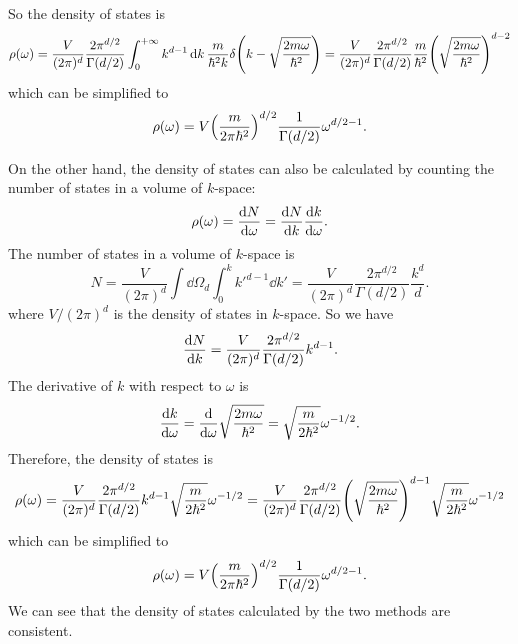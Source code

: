 \documentclass{article}
\begin{document}
So the density of states is
\begin{equation}
    \rho(\omega)=\frac{V}{(2\pi)^d}\frac{2\pi^{d/2}}{\Gamma(d/2)}\int_0^{+\infty} k^{d-1}\dd{k}\frac{m}{\hbar^2 k}\delta\qty(k-\sqrt{\frac{2m\omega}{\hbar^2}})=\frac{V}{(2\pi)^d}\frac{2\pi^{d/2}}{\Gamma(d/2)}\frac{m}{\hbar^2}\qty(\sqrt{\frac{2m\omega}{\hbar^2}})^{d-2}
\end{equation}
which can be simplified to
\begin{equation}
    \rho(\omega)=V\qty(\frac{m}{2\pi \hbar^2})^{d/2}\frac{1}{\Gamma(d/2)}\omega^{d/2-1}.
\end{equation}

On the other hand, the density of states can also be calculated by counting the number of states in a volume of $k$-space:
\begin{equation}
    \rho(\omega)=\dv{N}{\omega}=\dv{N}{k}\dv{k}{\omega}.
\end{equation}
The number of states in a volume of $k$-space is
\begin{equation}
    N=\frac{V}{(2\pi)^d}\int \dd{\Omega_d}\int_0^k k'^{d-1}\dd{k'}=\frac{V}{(2\pi)^d}\frac{2\pi^{d/2}}{\Gamma(d/2)}\frac{k^d}{d}.
\end{equation}
where $V/(2\pi)^d$ is the density of states in $k$-space.
So we have
\begin{equation}
    \dv{N}{k}=\frac{V}{(2\pi)^d}\frac{2\pi^{d/2}}{\Gamma(d/2)}k^{d-1}.
\end{equation}
The derivative of $k$ with respect to $\omega$ is
\begin{equation}
    \dv{k}{\omega}=\dv{}{\omega}\sqrt{\frac{2m\omega}{\hbar^2}}=\sqrt{\frac{m}{2\hbar^2}}\omega^{-1/2}.
\end{equation}
Therefore, the density of states is
\begin{equation}
    \rho(\omega)=\frac{V}{(2\pi)^d}\frac{2\pi^{d/2}}{\Gamma(d/2)}k^{d-1}\sqrt{\frac{m}{2\hbar^2}}\omega^{-1/2}=\frac{V}{(2\pi)^d}\frac{2\pi^{d/2}}{\Gamma(d/2)}\qty(\sqrt{\frac{2m\omega}{\hbar^2}})^{d-1}\sqrt{\frac{m}{2\hbar^2}}\omega^{-1/2}
\end{equation}
which can be simplified to
\begin{equation}
    \rho(\omega)=V\qty(\frac{m}{2\pi \hbar^2})^{d/2}\frac{1}{\Gamma(d/2)}\omega^{d/2-1}.
\end{equation}
We can see that the density of states calculated by the two methods are consistent.

%
%
\end{document}
